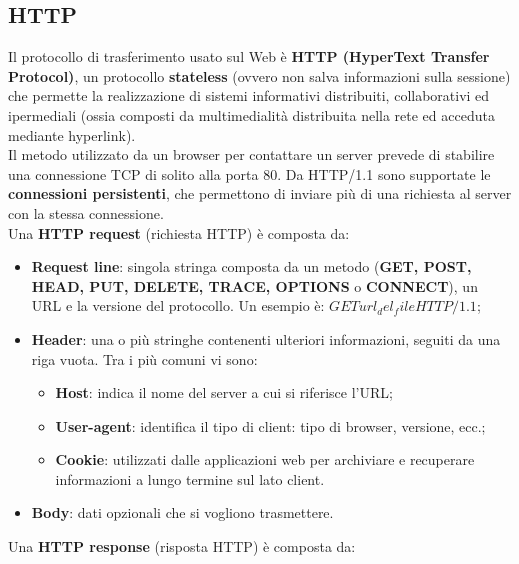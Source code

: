 \subsection{HTTP}
    Il protocollo di trasferimento usato sul Web è \textbf{HTTP (HyperText Transfer Protocol)}, un
    protocollo \textbf{stateless} (ovvero non salva informazioni sulla sessione) che permette la
    realizzazione di sistemi informativi distribuiti, collaborativi ed ipermediali (ossia composti da
    multimedialità distribuita nella rete ed acceduta mediante hyperlink).\\

    Il metodo utilizzato da un browser per contattare un server prevede di stabilire una
    connessione TCP di solito alla porta 80. Da HTTP/1.1 sono supportate le \textbf{connessioni
    persistenti}, che permettono di inviare più di una richiesta al server con la stessa connessione.\\

    Una \textbf{HTTP request} (richiesta HTTP) è composta da:

        \begin{itemize}
            \item \textbf{Request line}: singola stringa composta da un metodo (\textbf{GET, POST, HEAD, PUT, DELETE, TRACE, OPTIONS}
            o \textbf{CONNECT}), un URL e la versione del protocollo.
            Un esempio è: $GET url_del_file HTTP/1.1$;
            \item \textbf{Header}: una o più stringhe contenenti ulteriori informazioni, seguiti da una riga vuota.
            Tra i più comuni vi sono: \begin{itemize}
                \item \textbf{Host}: indica il nome del server a cui si riferisce l’URL;
                \item \textbf{User-agent}: identifica il tipo di client: tipo di browser, versione, ecc.;
                \item \textbf{Cookie}: utilizzati dalle applicazioni web per archiviare e recuperare
                informazioni a lungo termine sul lato client.
            \end{itemize}

            \item \textbf{Body}: dati opzionali che si vogliono trasmettere.
        \end{itemize}

    Una \textbf{HTTP response} (risposta HTTP) è composta da:

